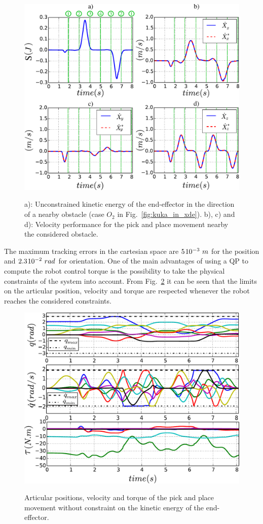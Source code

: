 \documentclass[a4paper, 10pt, conference]{ieeeconf}      %
\begin{document}
\begin{figure}[h]
\centering
{\includegraphics[width=0.9\columnwidth]{figures/vel_track_woO_Ec_woEc}}
\caption{a): Unconstrained kinetic energy of the end-effector in the direction of a nearby obstacle (case $O_2$ in Fig.~\ref{fig:kuka_in_xde}). b), c) and d): Velocity performance for the  pick and place movement nearby the considered obstacle.} 
\label{fig:vel_track_woO_woEc}
\end{figure}

The maximum tracking errors in the cartesian space are  $5 \hspace{0.3mm} 10^{-3}~m$ for the position and $2.3 \hspace{0.3mm} 10^{-2}~rad$ for orientation. One of the main advantages of using a QP to compute the robot control torque is the possibility to take the physical constraints of the system into account. From Fig.~\ref{fig:art_data_woO_woEc} it can be seen that the limits on the articular position, velocity and torque are respected whenever the robot reaches the considered constraints.

\begin{figure}[h]
\centering
{\includegraphics[width=0.9\columnwidth]{figures/art_data_woO_woEc}}
\caption{Articular positions, velocity and torque of the  pick and place movement without constraint on the kinetic energy of the end-effector.} 
\label{fig:art_data_woO_woEc}
\end{figure}
\end{document}
